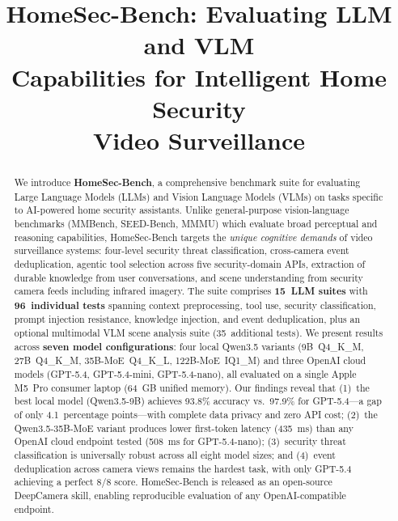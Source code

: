 \documentclass[onecolumn,10pt]{IEEEtran}
\begin{document}
\title{HomeSec-Bench: Evaluating LLM and VLM\\
Capabilities for Intelligent Home Security\\Video Surveillance}

\author{
}

\maketitle


\begin{abstract}
We introduce \textbf{HomeSec-Bench}, a comprehensive benchmark suite for
evaluating Large Language Models (LLMs) and Vision Language Models (VLMs) on
tasks specific to AI-powered home security assistants. Unlike general-purpose
vision-language benchmarks (MMBench, SEED-Bench, MMMU) which evaluate broad
perceptual and reasoning capabilities, HomeSec-Bench targets the
\emph{unique cognitive demands} of video surveillance systems: four-level
security threat classification, cross-camera event deduplication, agentic
tool selection across five security-domain APIs, extraction of durable
knowledge from user conversations, and scene understanding from security
camera feeds including infrared imagery. The suite comprises
\textbf{15~LLM suites} with \textbf{96~individual tests} spanning context
preprocessing, tool use, security classification, prompt injection resistance,
knowledge injection, and event deduplication, plus an optional multimodal
VLM scene analysis suite (35~additional tests). We present results across
\textbf{seven model configurations}: four local Qwen3.5 variants
(9B~Q4\_K\_M, 27B~Q4\_K\_M, 35B-MoE~Q4\_K\_L, 122B-MoE~IQ1\_M) and three
OpenAI cloud models (GPT-5.4, GPT-5.4-mini, GPT-5.4-nano), all evaluated
on a single Apple M5~Pro consumer laptop (64~GB unified memory). Our
findings reveal that (1)~the best local model (Qwen3.5-9B) achieves
93.8\% accuracy vs.\ 97.9\% for GPT-5.4---a gap of only 4.1~percentage
points---with complete data privacy and zero API cost; (2)~the
Qwen3.5-35B-MoE variant produces lower first-token latency (435~ms)
than any OpenAI cloud endpoint tested (508~ms for GPT-5.4-nano);
(3)~security threat classification is universally robust across all
eight model sizes; and (4)~event deduplication across camera views
remains the hardest task, with only GPT-5.4 achieving a perfect 8/8
score. HomeSec-Bench is released as an open-source DeepCamera skill,
enabling reproducible evaluation of any OpenAI-compatible endpoint.
\end{abstract}
\end{document}
